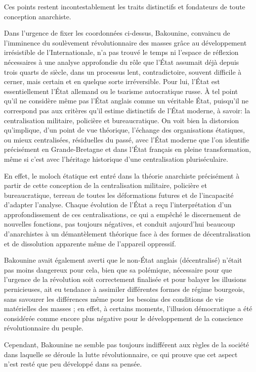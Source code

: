 Ces points restent incontestablement les traits distinctifs et fondateurs de toute conception anarchiste.

Dans l'urgence de fixer les coordonnées ci-dessus, Bakounine, convaincu de l'imminence du soulèvement révolutionnaire des masses grâce au développement irrésistible de l'Internationale, n'a pas trouvé le temps ni l'espace de réflexion nécessaires à une analyse approfondie du rôle que l'État assumait déjà depuis trois quarts de siècle, dans un processus lent, contradictoire, souvent difficile à cerner, mais certain et en quelque sorte irréversible. Pour lui, l'État est essentiellement l'État allemand ou le tsarisme autocratique russe. À tel point qu'il ne considère même pas l'État anglais comme un véritable État, puisqu'il ne correspond pas aux critères qu'il estime distinctifs de l'État moderne, à savoir: la centralisation militaire, policière et bureaucratique. On voit bien la distorsion qu'implique, d'un point de vue théorique, l'échange des organisations étatiques, ou mieux centralisées, résiduelles du passé, avec l'État moderne que l'on identifie précisément en Grande-Bretagne et dans l'État français en pleine transformation, même si c'est avec l'héritage historique d'une centralisation pluriséculaire.

En effet, le moloch étatique est entré dans la théorie anarchiste précisément à partir de cette conception de la centralisation militaire, policière et bureaucratique, terreau de toutes les déformations futures et de l'incapacité d'adapter l'analyse. Chaque évolution de l'État a reçu l'interprétation d'un approfondissement de ces centralisations, ce qui a empêché le discernement de nouvelles fonctions, pas toujours négatives, et conduit aujourd'hui beaucoup d'anarchistes à un démantèlement théorique face à des formes de décentralisation et de dissolution apparente même de l'appareil oppressif.

Bakounine avait également averti que le non-État anglais (décentralisé) n'était pas moins dangereux pour cela, bien que sa polémique, nécessaire pour que l'urgence de la révolution soit correctement finalisée et pour balayer les illusions pernicieuses, ait eu tendance à assimiler différentes formes de régime bourgeois, sans savourer les différences même pour les besoins des conditions de vie matérielles des masses ; en effet, à certains moments, l'illusion démocratique a été considérée comme encore plus négative pour le développement de la conscience révolutionnaire du peuple.

Cependant, Bakounine ne semble pas toujours indifférent aux règles de la société dans laquelle se déroule la lutte révolutionnaire, ce qui prouve que cet aspect n'est resté que peu développé dans sa pensée.

